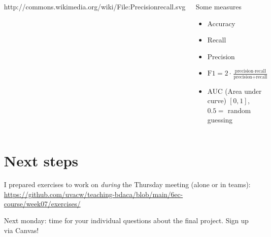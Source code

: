 \begin{frame}[plain]
	\begin{columns}[]
		
		{\tiny{http://commons.wikimedia.org/wiki/File:Precisionrecall.svg}}
		
		\begin{block}{Some measures}
			\begin{itemize}
				\item Accuracy
				\item Recall
				\item Precision
				\item $\text{F1}=2\cdot \frac{\text{precision}\cdot \text{recall}}{\text{precision}+\text{recall}}$
				\item AUC (Area under curve) $[0,1]$, $0.5=$ random guessing
			\end{itemize}
		\end{block}
		
	\end{columns}
	
\end{frame}





\section{Next steps}

\begin{frame}[standout]
I prepared exercises to work on \emph{during} the Thursday meeting (alone or in teams):
\large{\url{https://github.com/uvacw/teaching-bdaca/blob/main/6ec-course/week07/exercises/}}
\end{frame}

\begin{frame}[standout]
Next monday: time for your individual questions about the final project. 
Sign up via Canvas!
\end{frame}



\begin{frame}
	\printbibliography
\end{frame}




